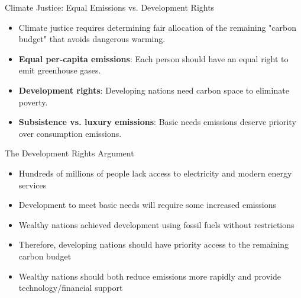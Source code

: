 \documentclass{beamer}
\begin{document}
	\begin{frame}{Climate Justice: Equal Emissions vs. Development Rights}
		\begin{itemize}
			\item Climate justice requires determining fair allocation of the remaining "carbon budget" that avoids dangerous warming.
			\item \textbf{Equal per-capita emissions}: Each person should have an equal right to emit greenhouse gases.
			\item \textbf{Development rights}: Developing nations need carbon space to eliminate poverty.
			\item \textbf{Subsistence vs. luxury emissions}: Basic needs emissions deserve priority over consumption emissions.
		\end{itemize}
		
		\begin{alertblock}{The Development Rights Argument}
			\scriptsize
			\begin{itemize}
				\item Hundreds of millions of people lack access to electricity and modern energy services
				\item Development to meet basic needs will require some increased emissions
				\item Wealthy nations achieved development using fossil fuels without restrictions
				\item Therefore, developing nations should have priority access to the remaining carbon budget
				\item Wealthy nations should both reduce emissions more rapidly and provide technology/financial support
			\end{itemize}
		\end{alertblock}
	\end{frame}
	
\end{document}
